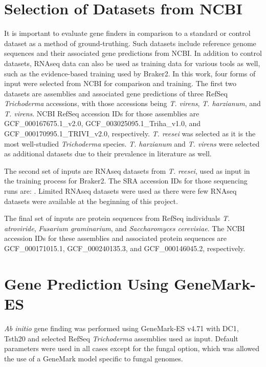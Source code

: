 \section{Selection of Datasets from NCBI}
\label{met:datasets}

It is important to evaluate gene finders in comparison to a standard
or control dataset as a method of ground-truthing. Such datasets
include reference genome sequences and their associated gene
predictions from NCBI. In addition to control datasets, RNAseq data
can also be used as training data for various tools as well, such as
the evidence-based training used by Braker2. In this work, four forms
of input were selected from NCBI for comparison and training. The
first two datasets are assemblies and associated gene predictions of
three RefSeq \textit{Trichoderma} accessions, with those accessions
being \textit{T. virens}, \textit{T. harzianum}, and
\textit{T. virens}. NCBI RefSeq accession IDs for those assemblies are
GCF\_000167675.1\_v2.0, GCF\_003025095.1\_Triha\_v1.0, and
GCF\_000170995.1\_TRIVI\_v2.0, respectively. \textit{T. reesei} was
selected as it is the most well-studied \textit{Trichoderma}
species. \textit{T. harzianum} and \textit{T. virens} were selected as
additional datasets due to their prevalence in literature as well.

The second set of inputs are RNAseq datasets from \textit{T. reesei},
used as input in the training process for Braker2. The SRA accession
IDs for those sequencing runs are: . Limited RNAseq datasets were used
as there were few RNAseq datasets were available at the beginning of
this project.

The final set of inputs are protein sequences from RefSeq individuals
\textit{T. atroviride}, \textit{Fusarium graminarium}, and
\textit{Saccharomyces cerevisiae}. The NCBI accession IDs for these
assemblies and associated protein sequences are GCF\_000171015.1,
GCF\_000240135.3, and GCF\_000146045.2, respectively.

\section{Gene Prediction Using GeneMark-ES}
\label{met:genemark}


\textit{Ab initio} gene finding was performed using GeneMark-ES
v4.71\cite{Borodovsky2011} with DC1, Tsth20 and selected RefSeq
\textit{Trichoderma} assemblies used as input. Default parameters were
used in all cases except for the fungal option, which was allowed the
use of a GeneMark model specific to fungal genomes.


